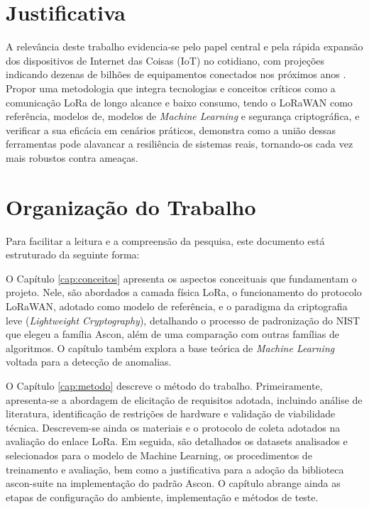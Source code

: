 
\section{Justificativa}
A relevância deste trabalho evidencia-se pelo papel central e pela rápida expansão dos dispositivos de Internet das Coisas (IoT) no cotidiano, com projeções indicando dezenas de bilhões de equipamentos conectados nos próximos anos \cite{ericsson2026mobility}. Propor uma metodologia que integra tecnologias e conceitos críticos como a comunicação LoRa de longo alcance e baixo consumo, tendo o LoRaWAN como referência, modelos de, modelos de \textit{Machine Learning} e segurança criptográfica, e verificar a sua eficácia em cenários práticos, demonstra como a união dessas ferramentas pode alavancar a resiliência de sistemas reais, tornando-os cada vez mais robustos contra ameaças.


\section{Organização do Trabalho}
Para facilitar a leitura e a compreensão da pesquisa, este documento está estruturado da seguinte forma:

O Capítulo \ref{cap:conceitos} apresenta os aspectos conceituais que fundamentam o projeto. Nele, são abordados a camada física LoRa, o funcionamento do protocolo LoRaWAN, adotado como modelo de referência, e o paradigma da criptografia leve (\textit{Lightweight Cryptography}), detalhando o processo de padronização do NIST que elegeu a família Ascon, além de uma comparação com outras famílias de algoritmos. O capítulo também explora a base teórica de \textit{Machine Learning} voltada para a detecção de anomalias.

O Capítulo \ref{cap:metodo} descreve o método do trabalho. Primeiramente, apresenta-se a abordagem de elicitação de requisitos adotada, incluindo análise de literatura, identificação de restrições de hardware e validação de viabilidade técnica. Descrevem-se ainda os materiais e o protocolo de coleta adotados na avaliação do enlace LoRa. Em seguida, são detalhados os datasets analisados e selecionados para o modelo de Machine Learning, os procedimentos de treinamento e avaliação, bem como a justificativa para a adoção da biblioteca ascon-suite na implementação do padrão Ascon. O capítulo abrange 
ainda as etapas de configuração do ambiente, implementação e métodos de teste.

